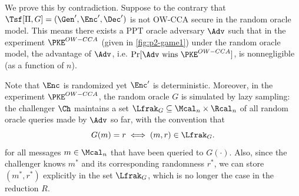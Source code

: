 \begin{answer}[i]
    We prove this by contradiction. Suppose to the contrary that $\Tsf[\Pi, G]=(\Gen', \Enc', \Dec')$ is not OW-CCA secure in the random oracle model.
    This means there exists a PPT oracle adversary $\Adv$ such that in the experiment $\PKE^{OW-CCA}$ (given in \autoref{fig:p2-game1}) under the random oracle model, the advantage of $\Adv$, i.e. $\Pr[\Adv \textrm{ wins } \PKE^{OW-CCA}]$, is nonnegligible (as a function of $n$). 
    
    Note that $\Enc$ is randomized yet $\Enc'$ is deterministic. Moreover, in the experiment $\PKE^{OW-CCA}$, the random oracle $G$ is simulated by lazy sampling: the challenger $\Ch$ maintains a set $\Lfrak_G\subseteq \Mcal_n\times \Rcal_n$ of all random oracle queries made by $\Adv$ so far, with the convention that 
    \[
        G(m)=r \iff (m,r)\in \Lfrak_G.
    \]
    for all  messages $m\in\Mcal_n$ that have been queried to $G(\cdot)$.
    Also, since the challenger knows $m^\ast$ and its corresponding randomness $r^\ast$, we can store $(m^\ast, r^\ast)$ explicitly in the set $\Lfrak_G$, which is no longer the case in the reduction $R$.
    

\end{answer}
